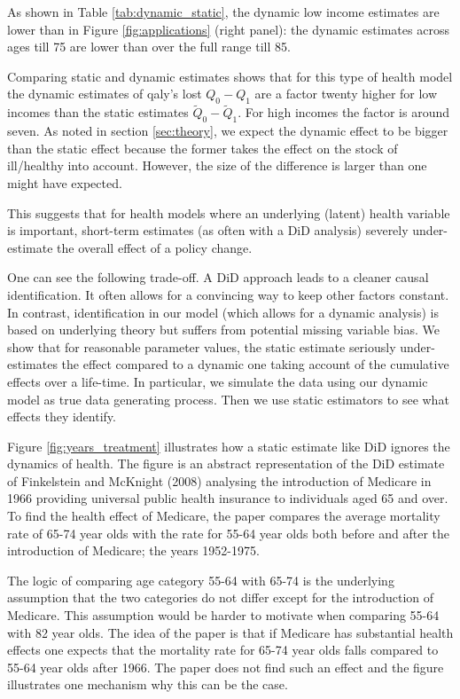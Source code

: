 \documentclass[a4paper,12pt]{article}
\makeatletter
\newcommand{\cslcitation}[2]
 {\protect\hyper@linkstart{cite}{citeproc_bib_item_#1}#2\hyper@linkend}
\makeatother
\begin{document}
As shown in Table \ref{tab:dynamic_static}, the dynamic low income estimates are lower than in Figure \ref{fig:applications} (right panel): the dynamic estimates across ages till 75 are lower than over the full range till 85.

Comparing static and dynamic estimates shows that for this type of health model the dynamic estimates of qaly's lost \(Q_0-Q_1\) are a factor twenty higher for low incomes than the static estimates \(\tilde Q_0 - \tilde Q_1\). For high incomes the factor is around seven. As noted in section \ref{sec:theory}, we expect the dynamic effect to be bigger than the static effect because the former takes the effect on the stock of ill/healthy into account. However, the size of the difference is larger than one might have expected.


This suggests that for health models where an underlying (latent) health variable is important, short-term estimates (as often with a DiD analysis) severely under-estimate the overall effect of a policy change.

One can see the following trade-off. A DiD approach leads to a cleaner causal identification. It often allows for a convincing way to keep other factors constant. In contrast, identification in our model (which allows for a dynamic analysis) is based on underlying theory but suffers from potential missing variable bias. We show that for reasonable parameter values, the static estimate seriously under-estimates the effect compared to a dynamic one taking account of the cumulative effects over a life-time. In particular, we simulate the data using our dynamic model as true data generating process. Then we use static estimators to see what effects they identify.

Figure \ref{fig:years_treatment} illustrates how a static estimate like DiD ignores the dynamics of health. The figure is an abstract representation of the DiD estimate of Finkelstein and McKnight (\cslcitation{4}{2008}) analysing the introduction of Medicare in 1966 providing universal public health insurance to individuals aged 65 and over. To find the health effect of Medicare, the paper compares the average mortality rate of 65-74 year olds with the rate for 55-64 year olds both before and after the introduction of Medicare; the years 1952-1975. 

The logic of comparing age category 55-64 with 65-74 is the underlying assumption that the two categories do not differ except for the introduction of Medicare. This assumption would be harder to motivate when comparing 55-64 with 82 year olds. The idea of the paper is that if Medicare has substantial health effects one expects that the mortality rate for 65-74 year olds falls compared to 55-64 year olds after 1966. The paper does not find such an effect and the figure illustrates one mechanism why this can be the case.
\end{document}
